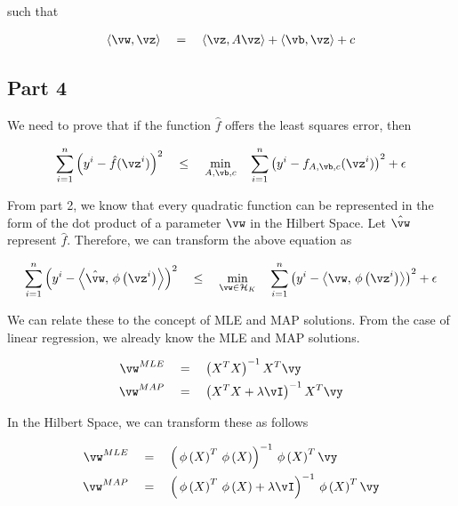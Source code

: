 \documentclass{article}
\begin{document}
\begin{mlsolution}
\begin{addmargin}{1.5em}
		such that

		\begin{align*}
			\ip{\vw}{\vz}	\eq	\ip{\vz}{A \vz} + \ip{\vb}{\vz} + c
		\end{align*}

	\end{addmargin}

	\subsection*{Part 4}
	\begin{addmargin}{1.5em}

		We need to prove that if the function $\hat{f}$ offers the least squares error, then

		\begin{align*}
			\sum_{i = 1}^n \para{y^i - \hat{f}(\vz^i)}^2	\qle	\min_{A, \vb, c} \quad \sum_{i = 1}^n \para{y^i - f_{A, \vb, c}(\vz^i)}^2 + \eps
		\end{align*} \br%

		From part 2, we know that every quadratic function can be represented in the form of the dot product of a parameter $\vw$ in the Hilbert Space. Let $\hat{\vw}$ represent $\hat{f}$. Therefore, we can transform the above equation as

		\begin{equation}
			\sum_{i = 1}^n \para{y^i - \ip{\hat{\vw}}{\func{\phi}{\vz^i}}}^2	\qle	\min_{\vw \in \Hlb} \quad \sum_{i = 1}^n \para{y^i - \ip{\vw}{\func{\phi}{\vz^i}}}^2 + \eps
			\label{eq:q4.1}
		\end{equation} \br%

		We can relate these to the concept of MLE and MAP solutions. From the case of linear regression, we already know the MLE and MAP solutions.

		\begin{align*}
			\vw^{MLE}	&\eq	\para{X^T X}^{-1} X^T \vy \\
			\vw^{MAP}	&\eq	\para{X^T X + \lambda \iden}^{-1} X^T \vy
		\end{align*} \br%

		In the Hilbert Space, we can transform these as follows

		\begin{align*}
			\vw^{MLE}	&\eq	\para{\func{\phi}{X}^T \func{\phi}{X}}^{-1} \func{\phi}{X}^T \vy \\
			\vw^{MAP}	&\eq	\para{\func{\phi}{X}^T \func{\phi}{X} + \lambda \iden}^{-1} \func{\phi}{X}^T \vy
		\end{align*} \br%


\end{addmargin}
\end{mlsolution}
\end{document}
